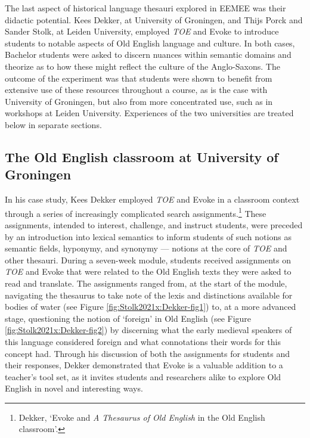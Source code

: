 The last aspect of historical language thesauri explored in EEMEE was their didactic potential. Kees Dekker, at University of Groningen, and Thijs Porck and Sander Stolk, at Leiden University, employed \textit{TOE} and Evoke to introduce students to notable aspects of Old English language and culture. In both cases, Bachelor students were asked to discern nuances within semantic domains and theorize as to how these might reflect the culture of the Anglo-Saxons. The outcome of the experiment was that students were shown to benefit from extensive use of these resources throughout a course, as is the case with University of Groningen, but also from more concentrated use, such as in workshops at Leiden University. Experiences of the two universities are treated below in separate sections.

\subsection{The Old English classroom at University of Groningen}

In his case study, Kees Dekker employed \textit{TOE} and Evoke in a classroom context through a series of increasingly complicated search assignments.\footnote{Dekker, `Evoke and \textit{A Thesaurus of Old English} in the Old English classroom'.} %
These assignments, intended to interest, challenge, and instruct students, were preceded by an introduction into lexical semantics to inform students of such notions as semantic fields, hyponymy, and synonymy --- notions at the core of \textit{TOE} and other thesauri. 
During a seven-week module, students received assignments on \textit{TOE} and Evoke that were related to the Old English texts they were asked to read and translate. The assignments ranged from, at the start of the module, navigating the thesaurus to take note of the lexis and distinctions available for bodies of water (see Figure \ref{fig:Stolk2021x:Dekker-fig1}) to, at a more advanced stage, questioning the notion of `foreign' in Old English (see Figure \ref{fig:Stolk2021x:Dekker-fig2}) by discerning what the early medieval speakers of this language considered foreign and what connotations their words for this concept had. Through his discussion of both the assignments for students and their responses, Dekker demonstrated that Evoke is a valuable addition to a teacher's tool set, as it invites students and researchers alike to explore Old English in novel and interesting ways.

